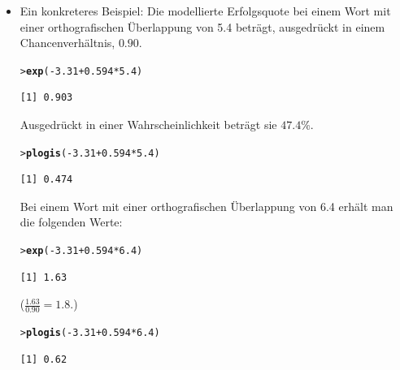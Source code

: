 \documentclass[oneside, 10pt]{book}\usepackage[]{graphicx}\usepackage[]{xcolor}
\makeatletter
\newcommand{\hlnum}[1]{\textcolor[rgb]{0.686,0.059,0.569}{#1}}%
\newcommand{\hlopt}[1]{\textcolor[rgb]{0,0,0}{#1}}%
\newcommand{\hlstd}[1]{\textcolor[rgb]{0.345,0.345,0.345}{#1}}%
\newcommand{\hlkwd}[1]{\textcolor[rgb]{0.737,0.353,0.396}{\textbf{#1}}}%
\newenvironment{kframe}{%
 \def\at@end@of@kframe{}%
 \ifinner\ifhmode%
  \def\at@end@of@kframe{\end{minipage}}%
  \begin{minipage}{\columnwidth}%
 \fi\fi%
 \def\FrameCommand##1{\hskip\@totalleftmargin \hskip-\fboxsep
 \colorbox{shadecolor}{##1}\hskip-\fboxsep
     \hskip-\linewidth \hskip-\@totalleftmargin \hskip\columnwidth}%
 \MakeFramed {\advance\hsize-\width
   \@totalleftmargin\z@ \linewidth\hsize
   \@setminipage}}%
 {\par\unskip\endMakeFramed%
 \at@end@of@kframe}
\newenvironment{knitrout}{}{} %
\makeatother
\begin{document}
\begin{itemize}
\item Ein konkreteres Beispiel: Die modellierte Erfolgsquote
bei einem Wort mit einer orthografischen Überlappung von 5.4 beträgt,
ausgedrückt in einem Chancenverhältnis, $0.90$.
\begin{knitrout}
\color{fgcolor}\begin{kframe}
\begin{alltt}
\hlstd{> }\hlkwd{exp}\hlstd{(}\hlopt{-}\hlnum{3.31} \hlopt{+} \hlnum{0.594} \hlopt{*} \hlnum{5.4}\hlstd{)}
\end{alltt}
\begin{verbatim}
[1] 0.903
\end{verbatim}
\end{kframe}
\end{knitrout}

Ausgedrückt in einer Wahrscheinlichkeit beträgt sie $47.4$\%.
\begin{knitrout}
\color{fgcolor}\begin{kframe}
\begin{alltt}
\hlstd{> }\hlkwd{plogis}\hlstd{(}\hlopt{-}\hlnum{3.31} \hlopt{+} \hlnum{0.594} \hlopt{*} \hlnum{5.4}\hlstd{)}
\end{alltt}
\begin{verbatim}
[1] 0.474
\end{verbatim}
\end{kframe}
\end{knitrout}

Bei einem Wort mit einer orthografischen Überlappung von
6.4 erhält man die folgenden Werte:
\begin{knitrout}
\color{fgcolor}\begin{kframe}
\begin{alltt}
\hlstd{> }\hlkwd{exp}\hlstd{(}\hlopt{-}\hlnum{3.31} \hlopt{+} \hlnum{0.594} \hlopt{*} \hlnum{6.4}\hlstd{)}
\end{alltt}
\begin{verbatim}
[1] 1.63
\end{verbatim}
\end{kframe}
\end{knitrout}
($\frac{1.63}{0.90} = 1.8$.)
\begin{knitrout}
\color{fgcolor}\begin{kframe}
\begin{alltt}
\hlstd{> }\hlkwd{plogis}\hlstd{(}\hlopt{-}\hlnum{3.31} \hlopt{+} \hlnum{0.594} \hlopt{*} \hlnum{6.4}\hlstd{)}
\end{alltt}
\begin{verbatim}
[1] 0.62
\end{verbatim}
\end{kframe}
\end{knitrout}

\end{itemize}
\end{document}
